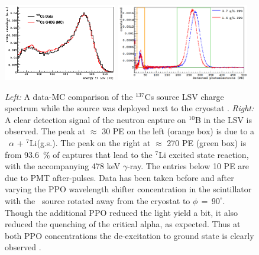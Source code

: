 \begin{figure}[htbp]
\centering
\includegraphics[width=0.44\textwidth]{./Figures/Cs137_LSV}
\includegraphics[width=0.515\textwidth]{./Figures/AmBe_LSV_VetoPaper}
\caption{\textit{Left:} A data-MC comparison of the $^{137}$Cs source LSV charge spectrum while the source was deployed next to the cryostat \cite{DS50:G4DS:paper}.
\textit{Right:} A clear detection signal of the neutron capture on $^{10}$B in the LSV is observed. The peak at $\approx$ 30 PE on the left (orange box) is due to a \enbortengroundalpha\ $\alpha$ + $^7$Li(g.s.). The peak on the right at $\approx$ 270 PE (green box) is from 93.6~\% of captures that lead to the $^7$Li excited state reaction, with the accompanying 478 keV $\gamma$-ray. The entries below 10 PE are due to PMT after-pulses. Data has been taken before and after varying the PPO wavelength shifter concentration in the scintillator with the \AmBe\ source rotated away from the cryostat to $\phi\,=\,90^{\circ}$. Though the additional PPO reduced the light yield a bit, it also reduced the quenching of the critical alpha, as expected. Thus at both PPO concentrations the de-excitation to ground state is clearly observed \cite{Agnes:2015qyz}.
\label{fig:LSV:Calib}} 
\end{figure}


